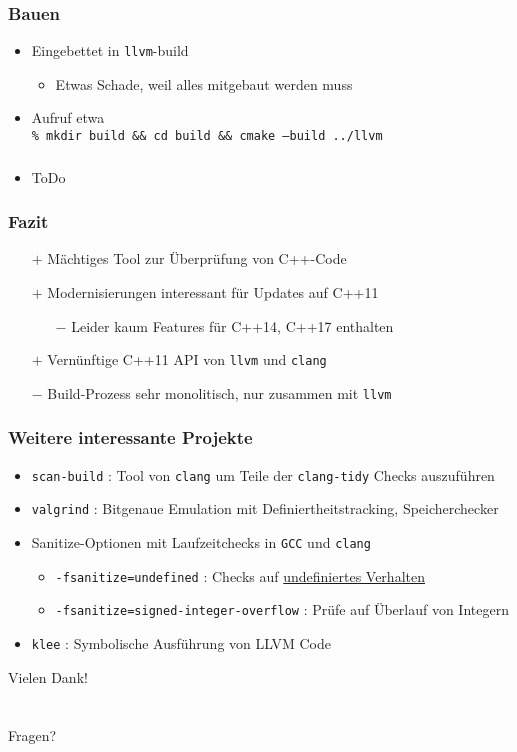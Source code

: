 \documentclass[aspectratio=169]{beamer}
\begin{document}
\begin{frame}
  \frametitle{Bauen}
  \begin{itemize}
  \item Eingebettet in \texttt{llvm}-build
    \begin{itemize}
    \item Etwas Schade, weil alles mitgebaut werden muss
    \end{itemize}
  \item Aufruf etwa\\
    \qquad \texttt{\% mkdir build \&\& cd build \&\& cmake --build ../llvm}
  \end{itemize}  
\end{frame}

\begin{frame}
  \frametitle{}
  \begin{itemize}
    \item ToDo
  \end{itemize}
\end{frame}

\begin{frame}
  \frametitle{Fazit}
  \begin{itemize}
    \item[$+$] Mächtiges Tool zur Überprüfung von C++-Code
    \item[$+$] Modernisierungen interessant für Updates auf C++11 
      \begin{itemize}
      \item[$-$] Leider kaum Features für C++14, C++17 enthalten
      \end{itemize}
    \item[$+$] Vernünftige C++11 API von \texttt{llvm} und \texttt{clang}  
    \item[$-$] Build-Prozess sehr monolitisch, nur zusammen mit \texttt{llvm}
  \end{itemize}
\end{frame}

\begin{frame}
  \frametitle{Weitere interessante Projekte}
  \begin{itemize}
    \item \texttt{scan-build} : Tool von \texttt{clang} um Teile der \texttt{clang-tidy} Checks auszuführen
    \item \texttt{valgrind} : Bitgenaue Emulation mit Definiertheitstracking, Speicherchecker
    \item Sanitize-Optionen mit Laufzeitchecks in \texttt{GCC} und \texttt{clang}
      \begin{itemize}
      \item \texttt{-fsanitize=undefined} : Checks auf \href{https://blog.regehr.org/archives/213}{undefiniertes Verhalten}
      \item \texttt{-fsanitize=signed-integer-overflow} : Prüfe auf Überlauf von Integern
      \end{itemize}
    \item \texttt{klee} : Symbolische Ausführung von LLVM Code
    \end{itemize}
\end{frame}

\begin{frame}
  \begin{center}
    \Huge{Vielen Dank!}\\
    ~\\
    ~\\
    \Large{Fragen?}
  \end{center}
\end{frame}
\end{document}
